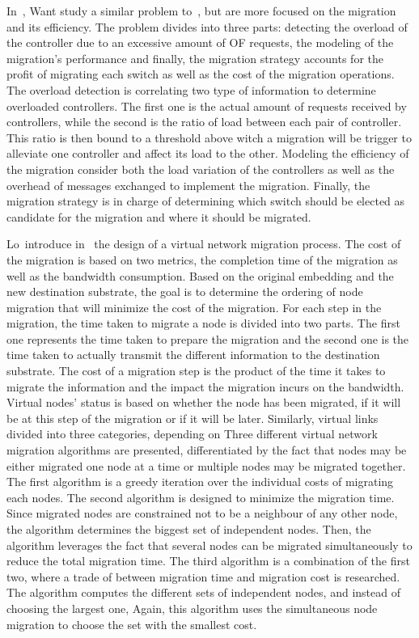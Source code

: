 In~\cite{Wang2017d}, Want \etal study a similar problem to~\cite{Ye2017a}, but are more focused on the migration and its efficiency. 
The problem divides into three parts: detecting the overload of the controller due to an excessive amount of OF requests, the modeling of the migration's performance and finally, the migration strategy accounts for the profit of migrating each switch as well as the cost of the migration operations.
The overload detection is correlating two type of information to determine overloaded controllers.
The first one is the actual amount of requests received by controllers, while the second is the ratio of load between each pair of controller.
This ratio is then bound to a threshold above witch a migration will be trigger to alleviate one controller and affect its load to the other.
Modeling the efficiency of the migration consider both the load variation of the controllers as well as the overhead of messages exchanged to implement the migration.  
Finally, the migration strategy is in charge of determining which switch should be elected as candidate for the migration and where it should be migrated.

Lo~\etal introduce in~\cite{vnm-lo2013} the design of a virtual network migration process.
The cost of the migration is based on two metrics, the completion time of the migration as well as the bandwidth consumption.
Based on the original embedding and the new destination substrate, the goal is to determine the ordering of node migration that will minimize the cost of the migration.
For each step in the migration, the time taken to migrate a node is divided into two parts. The first one represents the time taken to prepare the migration and the second one is the time taken to actually transmit the different information to the destination substrate.
The cost of a migration step is the product of the time it takes to migrate the information and the impact the migration incurs on the bandwidth.
Virtual nodes' status is based on whether the node has been migrated, if it will be at this step of the migration or if it will be later.
Similarly, virtual links divided into three categories, depending on 
Three different virtual network migration algorithms are presented, differentiated by the fact that nodes may be either migrated one node at a time or multiple nodes may be migrated together.
The first algorithm is a greedy iteration over the individual costs of migrating each nodes.
The second algorithm is designed to minimize the migration time. Since migrated nodes are constrained not to be a neighbour of any other node, the algorithm determines the biggest set of independent nodes.
Then, the algorithm leverages the fact that several nodes can be migrated simultaneously to reduce the total migration time.
The third algorithm is a combination of the first two, where a trade of between migration time and migration cost is researched. The algorithm computes the different sets of independent nodes, and instead of choosing the largest one, Again, this algorithm uses the simultaneous node migration to choose the set with the smallest cost.

